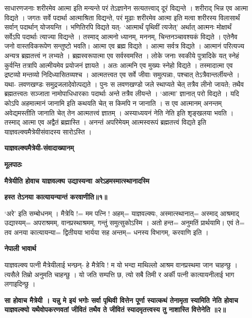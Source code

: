 \documentclass[11pt, a5paper]{article}
\begin{document}
साधारणजनाः शरीरमेव आत्मा इति मन्यन्ते परं तेऽज्ञानेन सत्यतत्त्वाद् दूरं विद्यन्ते  । शरीराद् भिन्न एव आत्मा विद्यते । जगतः सर्वे पदार्था आत्माश्रिता विद्यन्ते, परं मूढाः शरीरमेव आत्मा इति मत्वा शरीरस्य विलासार्थं सर्वान् पदार्थान् योजयन्ति । भणितिरपि विद्यते यत्- `आत्मार्थं पृथिवीं त्यजेत्' अर्थात् आत्मनः मोक्षार्थं सर्वेऽपि पदार्थाः त्याज्या विद्यन्ते । तस्माद् आत्मनो ध्यानम्, मननम्, चिन्तनञ्चावश्यकं विद्यते । एतेनैव जनो वास्तविकरूपेण सन्तुष्टो भवति। आत्मा एव ब्रह्म विद्यते । आत्मा सर्वत्र विद्यते । आत्मानं परित्यज्य अन्यत्र ब्रह्मतत्त्वं न लभ्यते । ब्रह्मस्वरूपात्मा एव सर्वस्वमस्ति । लोके जनाः स्वकीये पुत्रादिके यत् स्नेहं कुर्वन्ति तत्रापि आत्मीयमेव प्रयोजनं ज्ञायते  । अतः आत्मनि एव मुख्यः स्नेहो विद्यते । तस्मादात्मा एव द्रष्टव्यो मन्तव्यो निदिध्यासितव्यश्च । आत्मतत्त्वत एव सर्वे जीवाः समुत्पन्नाः, पश्चात् तेऽत्रैवान्तर्लीयन्ते । यथा- लवणखण्डः समुद्रजलादेवोत्पद्यते । पुनः स लवणखण्डो जले स्थाप्यते चेत् तत्रैव लीनो जायते; तथैव ब्रह्मतत्त्वतः सञ्जाता नामोपाधिधारकाः पदार्थाः अन्ते तत्रैव लीयन्ते । ‘आत्मा’ ज्ञानात् परो विद्यते । यदि कोऽपि अहमात्मानं जानामि इति कथयति चेत् स किमपि न जानाति । स एव आत्मानम् अनन्तम् अवेद्यमस्तीति जानाति चेत् तेन आत्मतत्त्वं ज्ञातम् । अस्याध्ययनं नेति नेति इति शृङ्खलया भवति । तस्माद् आत्मा एव अद्वैतं ब्रह्मास्ति । अनन्तं अपरिमेयम् आत्मस्वरूपं ब्रह्मतत्त्वं विद्यते इति याज्ञवल्क्यमैत्रेयीसंवादस्य सारोऽस्ति ।

\textbf{याज्ञवल्क्यमैत्रेयी-संवादाख्यानम्}

\textbf{मूलपाठः}

\textbf{मैत्रेयीति होवाच याज्ञवल्क्य उद्यास्यन्वा अरेऽहमस्मात्स्थानादस्मि}

\textbf{हस्त तेऽनया कात्यायन्यान्तं करवाणीति॥१॥}

‘अरे’ इति सम्बोधनम् । मैत्रेयि != मम पत्नि ! अहम्= याज्ञवल्क्यः, अस्मात्स्थानात्= अस्माद् आश्रमाद् उद्यास्यम्= अपराश्रमम्, वानप्रस्थाश्रमम्, गन्तुं समुत्सुकोऽस्मि । अतो हन्त= अनुमतिं प्रार्थयामि। एवं ते= तव अनया कात्यायन्या= द्वितीयया भार्यया सह अन्तम्= धनस्य विभागम्, करवाणि इति ।

\textbf{नेपाली भावार्थ}

याज्ञवल्क्य पत्नी मैत्रेयीलाई भन्छन्- हे मैत्रेयि ! म यो भन्दा माथिल्लो आश्रम वानप्रस्थमा जान चाहन्छु । त्यसैले तिम्रो अनुमति चाहन्छु । यो जति सम्पत्ति छ, त्यो सबै तिमी र अर्की पत्नी कात्यायनीलाई भाग लगाइदिन्छु ।

\textbf{सा होवाच मैत्रेयी । यन्नु मे इयं भगोः सर्वा पृथिवी वित्तेन पूर्णा स्यात्कथं तेनामृता स्यामिति नेति होवाच याज्ञवल्क्यो यथैवोपकरणवतां जीवितं तथैव ते जीवितं स्यादमृतत्त्वस्य तु नाशास्ति वित्तेनेति ॥२॥}
\end{document}
